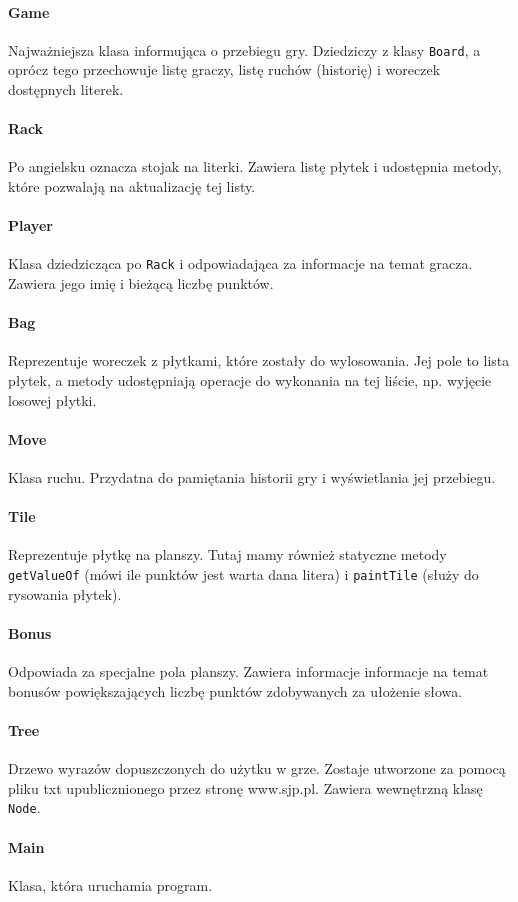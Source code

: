 \documentclass[a4paper]{article}
\begin{document}
\paragraph{Game} Najważniejsza klasa informująca o przebiegu gry. Dziedziczy z klasy \texttt{Board}, a oprócz tego przechowuje listę graczy, listę ruchów (historię) i woreczek dostępnych literek.
\paragraph{Rack} Po angielsku oznacza stojak na literki. Zawiera listę płytek i udostępnia metody, które pozwalają na aktualizację tej listy.
\paragraph{Player} Klasa dziedzicząca po \texttt{Rack} i odpowiadająca za informacje na temat gracza. Zawiera jego imię i bieżącą liczbę punktów.
\paragraph{Bag} Reprezentuje woreczek z płytkami, które zostały do wylosowania. Jej pole to lista płytek, a metody udostępniają operacje do wykonania na tej liście, np. wyjęcie losowej płytki.
\paragraph{Move} Klasa ruchu. Przydatna do pamiętania historii gry i wyświetlania jej przebiegu.
\paragraph{Tile} Reprezentuje płytkę na planszy. Tutaj mamy również statyczne metody \texttt{getValueOf} (mówi ile punktów jest warta dana litera) i \texttt{paintTile} (służy do rysowania płytek).
\paragraph{Bonus} Odpowiada za specjalne pola planszy. Zawiera informacje informacje na temat bonusów powiększających liczbę punktów zdobywanych za ułożenie słowa.
\paragraph{Tree}
Drzewo wyrazów dopuszczonych do użytku w grze. Zostaje utworzone za pomocą pliku txt upublicznionego przez stronę www.sjp.pl. Zawiera wewnętrzną klasę \texttt{Node}. 
\paragraph{Main}
Klasa, która uruchamia program.
\end{document}
